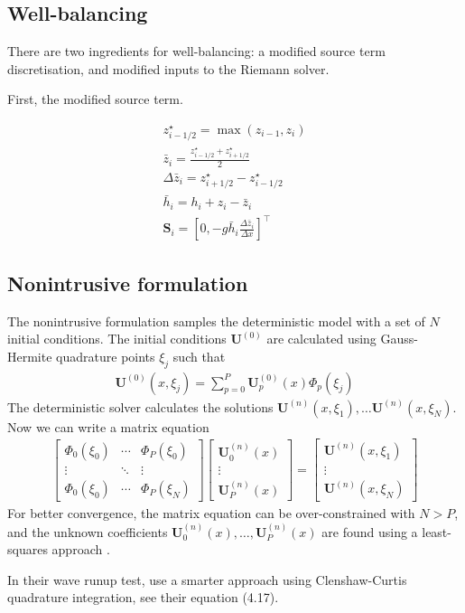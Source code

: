 \documentclass{article}
\newcommand{\vect}{\mathbf}
\newcommand{\zbar}{\bar{z}}
\newcommand{\zstar}{z^\star}
\begin{document}
\subsection*{Well-balancing}
There are two ingredients for well-balancing: a modified source term discretisation, and modified inputs to the Riemann solver.

First, the modified source term.

\begin{align}
	\zstar_{i-1/2} = \max(z_{i-1}, z_i) \\
	\zbar_i = \frac{\zstar_{i-1/2} + \zstar_{i+1/2}}{2} \\
	\Delta \zbar_i = \zstar_{i+1/2} - \zstar_{i-1/2} \\
	\bar{h}_i = h_i + z_i - \zbar_i \\
	\vect{S}_i = \left[ 0, -g \bar{h}_i \frac{\Delta \zbar_i}{\Delta x} \right]^\intercal
\end{align}

\subsection*{Nonintrusive formulation}

The nonintrusive formulation samples the deterministic model with a set of $N$ initial conditions.
The initial conditions $\vect{U}^{(0)}$ are calculated using Gauss-Hermite quadrature points $\xi_j$ such that
\begin{align}
	\vect{U}^{(0)}(x, \xi_j) = \sum_{p=0}^P \vect{U}_p^{(0)}(x) \Phi_p(\xi_j)
\end{align}
The deterministic solver calculates the solutions $\vect{U}^{(n)}(x, \xi_1), \ldots \vect{U}^{(n)}(x, \xi_N)$.
Now we can write a matrix equation
\begin{align}
	\begin{bmatrix}
		\Phi_0(\xi_0) & \cdots & \Phi_P(\xi_0) \\
		\vdots & \ddots & \vdots \\
		\Phi_0(\xi_0) & \cdots & \Phi_P(\xi_N)
	\end{bmatrix}
	\begin{bmatrix}
		\vect{U}_0^{(n)}(x) \\
		\vdots \\
		\vect{U}_P^{(n)}(x)
	\end{bmatrix}
	=
	\begin{bmatrix}
		\vect{U}^{(n)}(x, \xi_1) \\
		\vdots \\
		\vect{U}^{(n)}(x, \xi_N)
	\end{bmatrix}
\end{align}
For better convergence, the matrix equation can be over-constrained with $N > P$, and the unknown coefficients $\vect{U}_0^{(n)}(x), \ldots, \vect{U}_P^{(n)}(x)$ are found using a least-squares approach \citep{hosder2007}.

In their wave runup test, \citet{ge2009} use a smarter approach using Clenshaw-Curtis quadrature integration, see their equation (4.17).



\end{document}
